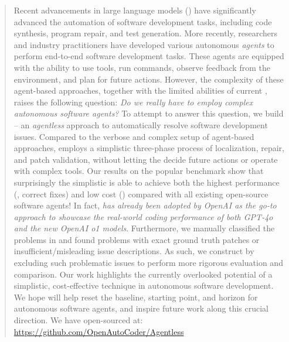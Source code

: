 \documentclass{article} %
\begin{document}
\begin{abstract}
Recent advancements in large language models () have significantly advanced the automation of software development tasks, including code synthesis, program repair, and test generation. 
More recently, researchers and industry practitioners have developed various autonomous \emph{\llm agents} to perform end-to-end software development tasks. 
These agents are equipped with the ability to use tools, run commands, observe feedback from the environment, and plan for future actions. 
However, the complexity of these agent-based approaches, together with the limited abilities of current , raises the following question: 
\emph{Do we really have to employ complex autonomous software agents?}
To attempt to answer this question, we build \tech{} -- an \emph{agentless} approach to automatically resolve software development {issues}.
Compared to the verbose and complex setup of agent-based approaches, \tech employs a simplistic three-phase process of localization, repair, and patch validation, without letting the \llm decide future actions or operate with complex tools. 
Our results on the popular \swebenchlite benchmark show that surprisingly the simplistic \tech is able to achieve both the highest performance (\totalsolveperc{}, \totalsolve{} correct fixes) and low cost (\averagedollarcost) compared with all existing open-source software agents!
In fact, \emph{\tech has already been adopted by OpenAI as the go-to approach to showcase the real-world coding performance of both GPT-4o and the new OpenAI o1 models}.
Furthermore, we manually classified the problems in \swebenchlite and found problems with exact ground truth patches or insufficient/misleading issue descriptions.
As such, we construct \swebenchlitefiltered{} by excluding such problematic {issues} to perform more rigorous evaluation and comparison. 
Our work highlights the currently overlooked potential of a simplistic, {cost-effective} technique in autonomous software development.
We hope \tech will help reset the baseline, starting point, and horizon for autonomous software agents, and inspire future work along this crucial direction. 
We have open-sourced \tech at: \textcolor{linkcolor}{\url{https://github.com/OpenAutoCoder/Agentless}}

\end{abstract}













\end{document}
